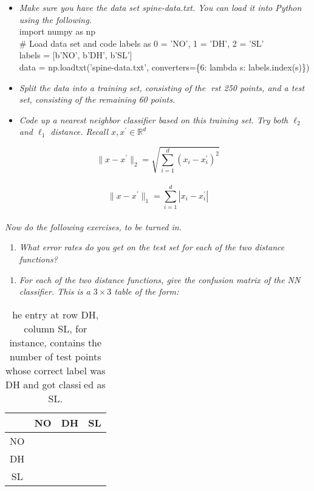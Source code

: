 \documentclass{article}
\begin{document}
\begin{itemize}
    \item \textit{Make sure you have the data set spine-data.txt. You can load it into Python using the following.}\\
    import numpy as np\\
    \# Load data set and code labels as 0 = 'NO', 1 = 'DH', 2 = 'SL'\\
    labels = [b'NO', b'DH', b'SL']\\
    data = np.loadtxt('spine-data.txt', converters=\{6: lambda s: labels.index(s)\})\\
    \item \textit{Split the data into a training set, consisting of the rst 250 points, and a test set, consisting of
the remaining 60 points.}
    \item \textit{Code up a nearest neighbor classifier based on this training set. Try both $\ell_2$ and $\ell_1$ distance. Recall $x, x^{\prime} \in \mathbb{R}^d$}
\end{itemize}

$$\|x-x^{\prime}\|_2 = \sqrt{\sum_{i=1}^{d} (x_i - x^{\prime}_i)^2}$$\\

$$\|x-x^{\prime}\|_1 = \sum_{i=1}^{d} |x_i - x^{\prime}_i|$$\\

\textit{Now do the following exercises, to be turned in.}

\begin{enumerate}[label=(a)]
  \item \textit{What error rates do you get on the test set for each of the two distance functions?}
\end{enumerate}
\begin{enumerate}[label=(b)]
  \item \textit{For each of the two distance functions, give the confusion matrix of the NN classifier. This is a
$3 \times 3$ table of the form:}
\end{enumerate}

\begin{table}[h]
\centering
\begin{tabular}{c|c|c|c}
  & NO & DH & SL \\ \hline
NO &   &   &   \\ \hline
DH &   &   &   \\ \hline
SL &   &   &   \\ \hline
\end{tabular}
\caption{he entry at row DH, column SL, for instance, contains the number of test points whose correct
label was DH and got classied as SL.}
\label{tab:empty3x3}
\end{table}
\end{document}
